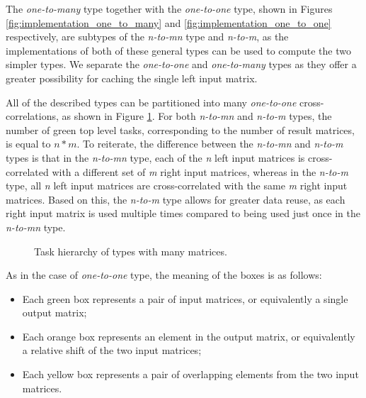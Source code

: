 The \textit{one-to-many} type together with the \textit{one-to-one} type, shown in Figures \ref{fig:implementation_one_to_many} and \ref{fig:implementation_one_to_one} respectively, are subtypes of the \textit{n-to-mn} type and \textit{n-to-m}, as the implementations of both of these general types can be used to compute the two simpler types. We separate the \textit{one-to-one} and \textit{one-to-many} types as they offer a greater possibility for caching the single left input matrix.

All of the described types can be partitioned into many \textit{one-to-one} cross-correlations, as shown in Figure \ref{fig:cross_corr_many_tasks}. For both \textit{n-to-mn} and \textit{n-to-m} types, the number of green top level tasks, corresponding to the number of result matrices, is equal to $n*m$. To reiterate, the difference between the \textit{n-to-mn} and \textit{n-to-m} types is that in the \textit{n-to-mn} type, each of the \textit{n} left input matrices is cross-correlated with a different set of \textit{m} right input matrices, whereas in the \textit{n-to-m} type, all \textit{n} left input matrices are cross-correlated with the same \textit{m} right input matrices. Based on this, the \textit{n-to-m} type allows for greater data reuse, as each right input matrix is used multiple times compared to being used just once in the \textit{n-to-mn} type. 

\begin{figure}[ht]
	\centering
	\def\svgwidth{0.8\textwidth}
	
	\caption{Task hierarchy of types with many matrices.}
	\label{fig:cross_corr_many_tasks}
\end{figure}

As in the case of \textit{one-to-one} type, the meaning of the boxes is as follows:

\begin{itemize}
	\item Each green box represents a pair of input matrices, or equivalently a single output matrix;
	\item Each orange box represents an element in the output matrix, or equivalently a relative shift of the two input matrices;
	\item Each yellow box represents a pair of overlapping elements from the two input matrices.
\end{itemize}

